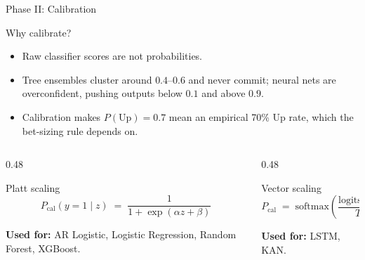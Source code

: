 \documentclass[aspectratio=169, t]{beamer}
\begin{document}
\begin{frame}{Phase II: Calibration}
\vspace{-0.4em}

{
\begin{block}{Why calibrate?}
\footnotesize
\begin{itemize}\setlength{\itemsep}{3pt}
  \item Raw classifier scores are not probabilities.
  \item Tree ensembles cluster around $0.4$--$0.6$ and never commit; neural nets are overconfident, pushing outputs below $0.1$ and above $0.9$.
  \item Calibration makes $P(\text{Up}) = 0.7$ mean an empirical 70\% Up rate, which the bet-sizing rule depends on.
\end{itemize}
\end{block}
}
\vspace{0.8em}

\begin{columns}[T]
\begin{column}{0.48\textwidth}
{
\begin{block}{Platt scaling}
\centering
\footnotesize
\vspace{-0.2em}
\[
  P_{\text{cal}}(y = 1 \mid z) \;=\; \frac{1}{1 + \exp(\alpha z + \beta)}
\]
\vspace{-0.6em}

\raggedright
\footnotesize \textbf{Used for:} AR Logistic, Logistic Regression, Random Forest, XGBoost.
\end{block}
}
\end{column}

\begin{column}{0.48\textwidth}
{
\begin{block}{Vector scaling}
\centering
\footnotesize
\vspace{-0.2em}
\[
  P_{\text{cal}} \;=\; \mathrm{softmax}\!\left( \frac{\mathrm{logits} + b}{T} \right)
\]
\vspace{-0.6em}

\raggedright
\footnotesize \textbf{Used for:} LSTM, KAN.
\end{block}
}
\end{column}
\end{columns}

\end{frame}
\end{document}
